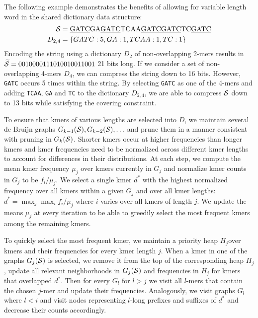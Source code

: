 \documentclass[12pt]{cmuthesis}
\begin{document}
  The following example demonstrates the benefits of allowing for variable length word in the shared dictionary data structure:
  \begin{align*}
    \mathcal{S} &= \textrm{\underline{GATC}GA\underline{GATC}TCAA\underline{GATC}\underline{GATC}TC\underline{GATC}} \\
    D_{2,4} &= \{GATC: 5, GA: 1, TCAA: 1, TC: 1\}
  \end{align*}
  Encoding the string using a dictionary $D_2$ of non-overlapping 2-mers results in $\widetilde{\mathcal{S}} = 0010000111010010011001$ 21 bits long. If we consider a set of non-overlapping 4-mers $D_4$, we 
  can compress the string down to 16 bits. However, \texttt{GATC} occurs 5 times within the string. By selecting \texttt{GATC} as one of the 4-mers and adding \texttt{TCAA}, \texttt{GA} and \texttt{TC} to the dictionary $D_{2,4}$, we are able to compress $\mathcal{S}$ down to 13 bits while satisfying the covering constraint. 

  To ensure that kmers of various lengths are selected into $D$, we maintain several de Bruijn graphs $G_{k-1}(\mathcal{S}), G_{k-2}(\mathcal{S}), \ldots$ and prune them in a manner consistent with pruning in $G_{k}(\mathcal{S})$. Shorter kmers occur at higher frequencies than longer kmers and kmer frequencies need to be normalized across different kmer lengths to account for differences in their distributions. At each step, we compute the mean kmer frequency $\mu_j$ over kmers currently in $G_{j}$ and normalize kmer counts in $G_j$ to be $f_i / \mu_j$. We select a single kmer $d^*$ with the highest normalized frequency over all kmers within a given $G_j$ and over all kmer lengths: $d^* = \max_j \max_i f_i / \mu_j$ where $i$ varies over all kmers of length $j$. We update the means $\mu_j$ at every iteration to be able to greedily select the most frequent kmers among the remaining kmers.

  To quickly select the most frequent kmer, we maintain a priority heap $H_j$over kmers and their frequencies for every kmer length $j$. When a kmer in one of the graphs $G_{j}(\mathcal{S})$ is selected, we remove it from the top of the corresponding heap $H_j$, update all relevant neighborhoods in $G_{j}(\mathcal{S})$ and frequencies in $H_j$ for kmers that overlapped $d^*$. Then for every $G_l$ for $l > j$ we visit all $l$-mers that contain the chosen $j$-mer and update their frequencies. Analogously, we visit graphs $G_l$ where $l < i$ and visit nodes representing $l$-long prefixes and suffixes of $d^*$ and decrease their counts accordingly.
\end{document}
